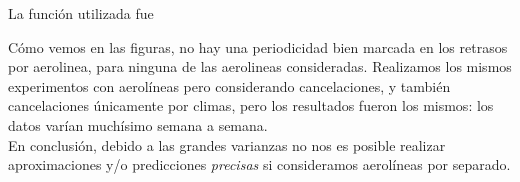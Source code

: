 La función utilizada fue \\

Cómo vemos en las figuras, no hay una periodicidad bien marcada en los retrasos por aerolinea, para ninguna de las aerolineas consideradas. Realizamos los mismos experimentos con aerolíneas pero considerando cancelaciones, y también cancelaciones únicamente por climas, pero los resultados fueron los mismos: los datos varían muchísimo semana a semana. \\

En conclusión, debido a las grandes varianzas no nos es posible realizar aproximaciones y/o predicciones \textit{precisas} si consideramos aerolíneas por separado. \\

